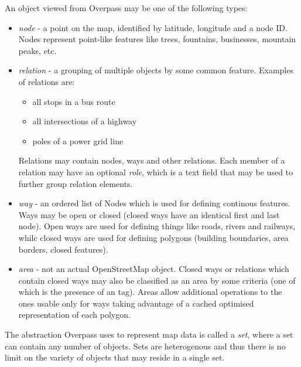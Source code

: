 \documentclass[main.tex]{subfiles}
\begin{document}
An object viewed from Overpass may be one of the following types:
\begin{itemize}
    \item \emph{node} - a point on the map, identified by latitude, longitude
        and a node ID. Nodes represent point-like features like trees, fountains,
        businesses, mountain peaks, etc.
    \item \emph{relation} - a grouping of multiple objects by some common
        feature. Examples of relations are:
        \begin{itemize}
            \item all stops in a bus route
            \item all intersections of a highway
            \item poles of a power grid line
        \end{itemize}
        Relations may contain nodes, ways and other relations. Each member of
        a relation may have an optional \emph{role}, which is a text field
        that may be used to further group relation elements.
    \item \emph{way} - an ordered list of Nodes which is used for defining
        continous features. Ways may be open or closed (closed ways have an
        identical first and last node). Open ways are used for defining things
        like roads, rivers and railways, whilc closed ways are used for defining
        polygons (building boundaries, area borders, closed features).
    \item \emph{area} - not an actual OpenStreetMap object. Closed ways or relations
        which contain closed ways may also be classified as an area by some
        criteria (one of which is the presence of an  tag).
        Areas allow additional operations to the ones usable only for ways
        taking advantage of a cached optimised representation of each polygon.
\end{itemize}

The abstraction Overpass uses to represent map data is called a \emph{set}, 
where a set can contain any number of objects. Sets are heterogenous and thus
there is no limit on the variety of objects that may reside in a single set.

\end{document}
